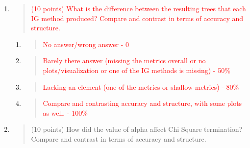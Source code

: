 \documentclass[
]{article}
\begin{document}
\begin{enumerate}
\def\labelenumi{\arabic{enumi}.}
\item
  \begin{quote}
  \textcolor{red}{(10 points) What is the difference between the resulting trees that
  each IG method produced? Compare and contrast in terms of accuracy and
  structure.}
  \end{quote}

  \begin{enumerate}
  \def\labelenumii{\alph{enumii}.}
  \item
    \begin{quote}
    \textcolor{red}{No answer/wrong answer - 0}
    \end{quote}
  \item
    \begin{quote}
    \textcolor{red}{Barely there answer (missing the metrics overall or no
    plots/visualization or one of the IG methods is missing) - 50\%}
    \end{quote}
  \item
    \begin{quote}
    \textcolor{red}{Lacking an element (one of the metrics or shallow metrics) - 80\%}
    \end{quote}
  \item
    \begin{quote}
    \textcolor{red}{Compare and contrasting accuracy and structure, with some plots as
    well. - 100\%}
    \end{quote}
  \end{enumerate}
\item
  \begin{quote}
  (10 points) How did the value of alpha affect Chi Square termination?
  Compare and contrast in terms of accuracy and structure.
  \end{quote}


\end{enumerate}
\end{document}
